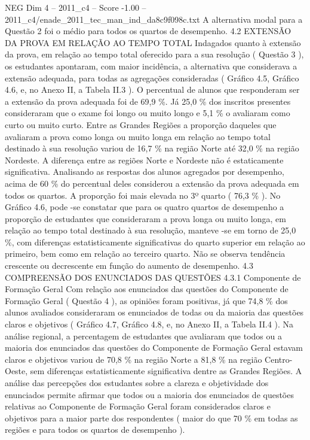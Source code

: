 \begin{textsample}{NEG Dim 4 – 2011\_c4 – Score -1.00 – 2011\_c4/enade\_2011\_tec\_man\_ind\_da8c9f098c.txt}
A alternativa modal para a Questão 2 foi o médio para todos os quartos de desempenho. 4.2 EXTENSÃO DA PROVA EM RELAÇÃO AO TEMPO TOTAL Indagados quanto à extensão da prova, em relação ao tempo total oferecido para a sua resolução ( Questão 3 ), os estudantes apontaram, com maior incidência, a alternativa que considerava a extensão adequada, para todas as agregações consideradas ( Gráfico 4.5, Gráfico 4.6, e, no Anexo II, a Tabela II.3 ).
O percentual de alunos que responderam ser a extensão da prova adequada foi de 69,9 \%.
Já 25,0 \% dos inscritos presentes consideraram que o exame foi longo ou muito longo e 5,1 \% o avaliaram como curto ou muito curto.
Entre as Grandes Regiões a proporção daqueles que avaliaram a prova como longa ou muito longa em relação ao tempo total destinado à sua resolução variou de 16,7 \% na região Norte até 32,0 \% na região Nordeste.
A diferença entre as regiões Norte e Nordeste não é estaticamente significativa.
Analisando as respostas dos alunos agregados por desempenho, acima de 60 \% do percentual deles considerou a extensão da prova adequada em todos os quartos.
A proporção foi mais elevada no 3º quarto ( 76,3 \% ).
No Gráfico 4.6, pode -se constatar que para os quatro quartos de desempenho a proporção de estudantes que consideraram a prova longa ou muito longa, em relação ao tempo total destinado à sua resolução, manteve -se em torno de 25,0 \%, com diferenças estatisticamente significativas do quarto superior em relação ao primeiro, bem como em relação ao terceiro quarto.
Não se observa tendência crescente ou decrescente em função do aumento de desempenho. 4.3 COMPREENSÃO DOS ENUNCIADOS DAS QUESTÕES 4.3.1 Componente de Formação Geral Com relação aos enunciados das questões do Componente de Formação Geral ( Questão 4 ), as opiniões foram positivas, já que 74,8 \% dos alunos avaliados consideraram os enunciados de todas ou da maioria das questões claros e objetivos ( Gráfico 4.7, Gráfico 4.8, e, no Anexo II, a Tabela II.4 ).
Na análise regional, a percentagem de estudantes que avaliaram que todos ou a maioria dos enunciados das questões do Componente de Formação Geral estavam claros e objetivos variou de 70,8 \% na região Norte a 81,8 \% na região Centro-Oeste, sem diferenças estatisticamente significativa dentre as Grandes Regiões.
A análise das percepções dos estudantes sobre a clareza e objetividade dos enunciados permite afirmar que todos ou a maioria dos enunciados de questões relativas ao Componente de Formação Geral foram considerados claros e objetivos para a maior parte dos respondentes ( maior do que 70 \% em todas as regiões e para todos os quartos de desempenho ).

\end{textsample}
